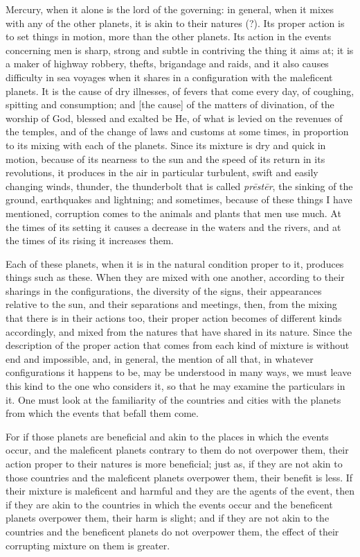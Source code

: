 \documentclass[11pt]{article}
\newcommand{\Fol}[1]{\marginpar{\footnotesize\color{gray}f.\,#1}}
\begin{document}
\par \Fol{29v}Mercury, when it alone is the lord of the governing: in general, when it mixes with any of the other planets, it is akin to their natures (?). Its proper action is to set things in motion, more than the other planets. Its action in the events concerning men is sharp, strong and subtle in contriving the thing it aims at; it is a maker of highway robbery, thefts, brigandage and raids, and it also causes difficulty in sea voyages when it shares in a configuration with the maleficent planets. It is the cause of dry illnesses, of fevers that come every day, of coughing, spitting and consumption; and [the cause] of the matters of divination, of the worship of God, blessed and exalted be He, of what is levied on the revenues of the temples, and of the change of laws and customs at some times, in proportion to its mixing with each of the planets. Since its mixture is dry and quick in motion, because of its nearness to the sun and the speed of its return in its revolutions, it produces in the air in particular turbulent, swift and easily changing winds, thunder, the thunderbolt that is called \emph{prēstēr}, the sinking of the ground, earthquakes and lightning; and sometimes, because of these things I have mentioned, corruption comes to the animals and plants that men use much. At the times of its setting it causes a decrease in the waters and the rivers, and at the times of its rising it increases them.\par
\par \Fol{30r}Each of these planets, when it is in the natural condition proper to it, produces things such as these. When they are mixed with one another, according to their sharings in the configurations, the diversity of the signs, their appearances relative to the sun, and their separations and meetings, then, from the mixing that there is in their actions too, their proper action becomes of different kinds accordingly, and mixed from the natures that have shared in its nature. Since the description of the proper action that comes from each kind of mixture is without end and impossible, and, in general, the mention of all that, in whatever configurations it happens to be, may be understood in many ways, we must leave this kind to the one who considers it, so that he may examine the particulars in it. One must look at the familiarity of the countries and cities with the planets from which the events that befall them come.\par
\par For if those planets are beneficial and akin to the places in which the events occur, and the maleficent planets contrary to them do not overpower them, their action proper to their natures is more beneficial; just as, if they are not akin to those countries and the maleficent planets overpower them, their benefit is less. If their mixture is maleficent and harmful and they are the agents of the event, then if they are akin to the countries in which the events occur and the beneficent planets overpower them, their harm is slight; and if they are not akin to the countries and the beneficent planets do not overpower them, the effect of their corrupting mixture on them is greater.\par
\end{document}
